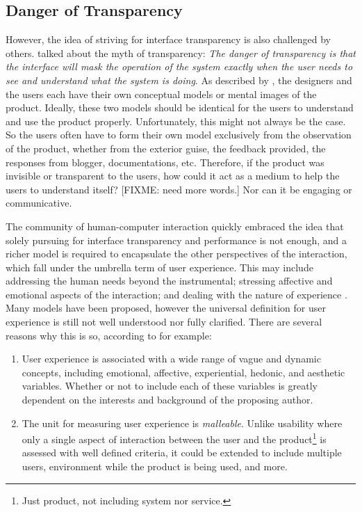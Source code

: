 \documentclass{acm_proc_article-sp}
\begin{document}
\subsection{Danger of Transparency}
However, the idea of striving for interface transparency is also
challenged by others. \citet{windows:bolter} talked about the myth of
transparency: \textit{The danger of transparency is that the interface
  will mask the operation of the system exactly when the user needs to
  see and understand what the system is doing}. As described by
\citet{design:norman}, the designers and the users each have their own
conceptual models or mental images of the product. Ideally, these two
models should be identical for the users to understand and use the
product properly. Unfortunately, this might not always be the case. So
the users often have to form their own model exclusively from the
observation of the product, whether from the exterior guise, the
feedback provided, the responses from blogger, documentations,
etc. Therefore, if the product was invisible or transparent to the
users, how could it act as a medium to help the users to understand
itself? [FIXME: need more words.] Nor can it be engaging or
communicative.

The community of human-computer interaction quickly embraced the
idea that solely pursuing for interface transparency and performance
is not enough, and a richer model is required to encapsulate the other
perspectives of the interaction, which fall under the umbrella term of
user experience. This may include addressing the human needs beyond
the instrumental; stressing affective and emotional aspects of the
interaction; and dealing with the nature of experience
\citep{ux:hassenzahl}. Many models have been proposed, however the
universal definition for user experience is still not well understood
nor fully clarified. There are several reasons why this is so,
according to \citet{ux:law} for example:
\begin{enumerate}
  \item User experience is associated with a wide range of vague and
    dynamic concepts, including emotional, affective, experiential,
    hedonic, and aesthetic variables. Whether or not to include each
    of these variables is greatly dependent on the interests and
    background of the proposing author.
  \item The unit for measuring user experience is
    \textit{malleable}. Unlike usability where only a single aspect of
    interaction between the user and the product\footnote{Just
      product, not including system nor service.} is assessed with
    well defined criteria, it could be extended to include multiple
    users, environment while the product is being used, and more.
\end{enumerate}
\end{document}
